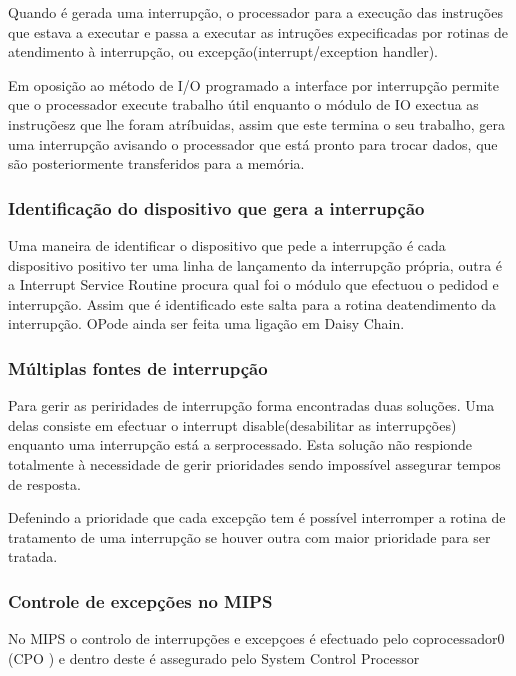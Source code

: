 \documentclass[10pt,a4paper]{paper}
\begin{document}
	Quando é gerada uma interrupção, o processador para a execução das instruções que estava a executar e passa a executar as intruções expecificadas por rotinas de atendimento à interrupção, ou excepção(interrupt/exception handler).
	
	Em oposição ao método de I/O programado a interface por interrupção  permite que o processador execute trabalho útil enquanto o módulo de IO  exectua as instruçõesz que lhe foram atríbuidas, assim que este termina o seu trabalho, gera uma interrupção avisando o processador que está pronto para trocar dados,  que são posteriormente transferidos para a memória.
	
	\subsubsection*{Identificação do dispositivo que gera a interrupção}
	
	Uma maneira de identificar o dispositivo que pede a interrupção é cada dispositivo positivo ter uma linha de lançamento da interrupção própria, outra é a Interrupt Service Routine procura qual foi o módulo que efectuou o pedidod e interrupção. Assim que é identificado este salta  para a rotina deatendimento da interrupção.
	OPode ainda ser feita uma ligação em Daisy Chain.
	
	
	\subsubsection*{Múltiplas fontes de interrupção}
	
	Para gerir as periridades de interrupção forma encontradas duas soluções.
	Uma delas consiste em efectuar o interrupt disable(desabilitar as interrupções) enquanto uma interrupção está a serprocessado. Esta solução não respionde totalmente à necessidade de gerir prioridades sendo impossível assegurar tempos de resposta.	
	
	Defenindo a prioridade que cada excepção tem é possível interromper a rotina de tratamento de uma interrupção se houver outra com maior prioridade para ser tratada.
	
	\subsubsection{Controle de excepções no MIPS}

No MIPS o controlo de interrupções e excepçoes é efectuado pelo coprocessador0 (CPO ) e dentro deste é assegurado pelo System Control Processor
\end{document}
